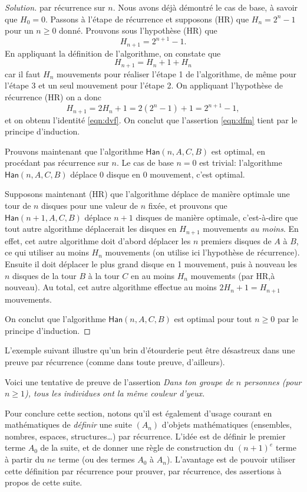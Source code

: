 \documentclass[french,course,oneside,theoremnosection]{lecture}
\begin{document}
\begin{proof}[Solution]
par récurrence sur $n$. Nous avons déjà démontré le cas de base, à savoir que $H_0=0$. Passons à  l'étape de récurrence et supposons (HR) que $H_n=2^{n}-1$ pour un $n\geq 0$ donné. Prouvons sous l'hypothèse (HR) que
\begin{equation}\label{eqn:dvf}
H_{n+1}=2^{n+1}-1.
\end{equation}
En appliquant la définition de l'algorithme, on constate que
\[
H_{n+1} = H_n+1+H_n
\]
car il faut $H_n$ mouvements pour réaliser l'étape 1 de l'algorithme, de même pour l'étape 3 et un seul mouvement pour l'étape 2. On appliquant l'hypothèse de récurrence (HR) on a donc
\[
H_{n+1}=2H_n+1=2(2^n-1)+1=2^{n+1}-1,
\]
et on obtenu l'identité \eqref{eqn:dvf}. On conclut que l'assertion \eqref{eqn:dfm} tient par le principe d'induction.
\smallskip

Prouvons maintenant que l'algorithme $\mathsf{Han}(n,A,C,B)$ est optimal, en procédant pas récurrence sur $n$. Le cas de base $n=0$ est trivial: l'algorithme $\mathsf{Han}(n,A,C,B)$ déplace 0  disque en 0 mouvement, c'est optimal.

Supposons maintenant (HR) que l'algorithme déplace de manière optimale une tour de $n$ disques pour une valeur de $n$ fixée, et prouvons que $\mathsf{Han}(n+1,A,C,B)$ déplace $n+1$ disques de manière optimale, c'est-à-dire que tout autre algorithme déplacerait les disques en $H_{n+1}$ mouvements \emph{au moins}. En effet, cet autre algorithme doit d'abord déplacer les $n$ premiers disques de $A$ à $B$, ce qui utiliser au moins $H_n$ mouvements (on utilise ici l'hypothèse de récurrence). Ensuite il doit déplacer le plus grand disque en 1 mouvement, puis à nouveau les $n$ disques de la tour $B$ à la tour $C$ en au moins $H_n$ mouvements (par HR,à nouveau). Au total, cet autre algorithme effectue au moins $2H_n+1=H_{n+1}$ mouvements.

On conclut que l'algorithme $\mathsf{Han}(n,A,C,B)$ est optimal pour tout $n\geq 0$ par le principe d'induction.
\end{proof}

L'exemple suivant illustre qu'un brin d'étourderie peut être désastreux dans une preuve par récurrence (comme dans toute preuve, d'ailleurs).
\begin{example}
Voici une tentative de preuve de l'assertion \emph{Dans ton groupe de $n$ personnes (pour $n\geq 1$), tous les individues ont la même couleur d'yeux.}
\end{example}

Pour conclure cette section, notons qu'il est également d'usage courant en mathématiques de \emph{définir} une suite $(A_n)$ d'objets mathématiques (ensembles, nombres, espaces, structures\ldots) par récurrence. L'idée est de définir le premier terme $A_0$ de la suite, et de donner une règle de construction du $(n+1)^{e}$ terme à partir du $n{e}$ terme (ou des termes $A_0$ à $A_n$). L'avantage est de pouvoir utiliser cette définition par récurrence pour prouver, par récurrence, des assertions à propos de cette suite.
\end{document}
